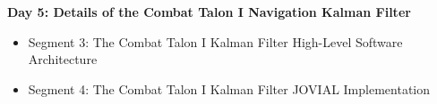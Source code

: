 \documentclass{beamer}
\begin{document}
\begin{frame}
\textbf{Day 5: Details of the Combat Talon I Navigation Kalman
Filter}
 \begin{itemize}
 \item Segment 3:  The Combat Talon I Kalman Filter High-Level Software Architecture
 \item Segment 4:  The Combat Talon I Kalman Filter JOVIAL Implementation
\end{itemize}
\end{frame}



\end{document}
